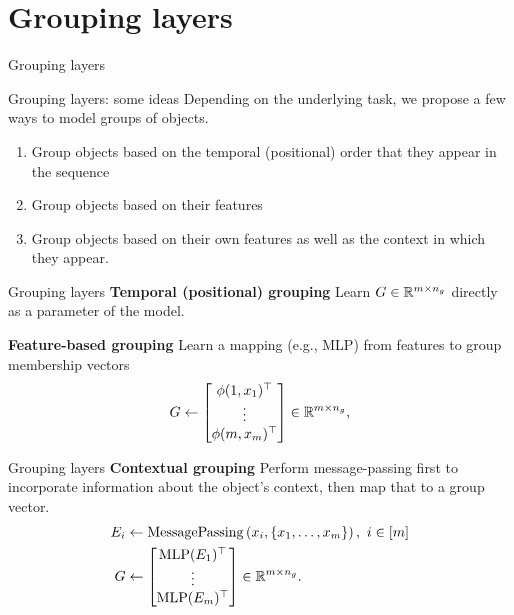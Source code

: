 \documentclass{beamer}
\begin{document}
\section{Grouping layers}
\begin{frame}{Grouping layers}
\end{frame}

\begin{frame}{Grouping layers: some ideas}
  Depending on the underlying task, we propose a few ways to model groups of objects.
  \begin{enumerate}
    \item Group objects based on the temporal (positional) order that they appear in the sequence
    \item Group objects based on their features
    \item Group objects based on their own features as well as the context in which they appear.
  \end{enumerate}
\end{frame}

\begin{frame}{Grouping layers}
  \textbf{Temporal (positional) grouping} Learn $G \in \mathbb{R}^{m \times n_g}$ directly as a parameter of the model.

  \textbf{Feature-based grouping} Learn a mapping (e.g., MLP) from features to group membership vectors
  \begin{equation}\label{eq:feat_grouping}
    G \gets \begin{bmatrix}
        \phi(1, x_1)^\top \\
        \vdots \\
        \phi(m, x_m)^\top
    \end{bmatrix} \in \mathbb{R}^{m \times n_g},
\end{equation}
\end{frame}

\begin{frame}{Grouping layers}
\textbf{Contextual grouping} Perform message-passing first to incorporate information about the object's context, then map that to a group vector.
\begin{equation}\label{eq:context_grouping}
  \begin{split}
      E_i &\gets \mathrm{MessagePassing}\left(x_i, \left\{x_1, \ldots, x_m\right\}\right), \ i \in [m] \\
      G &\gets \begin{bmatrix}\mathrm{MLP}(E_1)^\top \\ \vdots \\ \mathrm{MLP}(E_m)^\top \end{bmatrix} \in \mathbb{R}^{m \times n_g}.
  \end{split}
\end{equation}
\end{frame}
\end{document}
